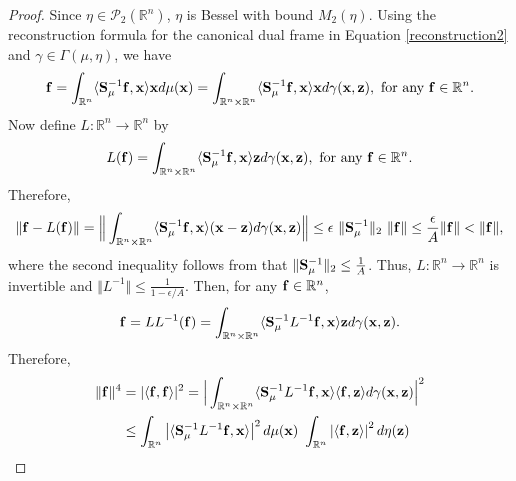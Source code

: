 \documentclass{amsart}
\numberwithin{equation}{section}
\theoremstyle{plain}
\theoremstyle{definition}
\begin{document}
\begin{proof}
Since $\eta \in \mathcal{P}_2(\mathbb{R}^n)$, $\eta$ is Bessel with bound  $M_2(\eta)$.  Using the reconstruction formula for the canonical dual frame in Equation \eqref{reconstruction2} and $\gamma \in \Gamma(\mu, \eta)$, we have
$$ 
{\bf f} =\int_{\mathbb{R}^n} \langle {\bf S}_\mu^{-1} {\bf f}, {\bf x} \rangle {\bf x}  d\mu({\bf x}) = \int_{\mathbb{R}^n \times \mathbb{R}^n} \langle {\bf S}_\mu^{-1} {\bf f}, {\bf x} \rangle {\bf x} d \gamma({\bf x},{\bf z})  , \ \text{for any} \ {\bf f} \in \mathbb{R}^n.
$$
Now define $L: \mathbb{R}^n \rightarrow \mathbb{R}^n$ by 
     \begin{equation*}
         L({\bf f}) = \int_{\mathbb{R}^n \times \mathbb{R}^n} \langle {\bf S}_\mu^{-1} {\bf f}, {\bf x} \rangle {\bf z}  d \gamma({\bf x},{\bf z}), \ \text{for any} \ {\bf f} \in \mathbb{R}^n.
     \end{equation*}
Therefore, 
\begin{equation*}
    \Vert {\bf f} -L({\bf f}) \Vert 
    = \Big \Vert \int_{\mathbb{R}^n \times \mathbb{R}^n} \langle {\bf S}_\mu^{-1}{\bf f}, {\bf x} \rangle ({\bf x}-{\bf z}) d \gamma({\bf x}, {\bf z}) \Big \Vert 
     \leq \epsilon \ \Vert {\bf S}_\mu^{-1} \Vert_2 \ \Vert  {\bf f} \Vert  \leq \frac{\epsilon}{A}  \Vert  {\bf f} \Vert < \Vert  {\bf f} \Vert,
\end{equation*}
where the second inequality follows from that $\|{\bf S}_\mu^{-1}\|_2 \leq \frac{1}{A}$. 
Thus, $L: \mathbb{R}^n \rightarrow \mathbb{R}^n$ is invertible and $\Vert L^{-1} \Vert \leq \frac{1}{1-\epsilon/ A}$.
Then, for any ${\bf f} \in \mathbb{R}^n$, 
\begin{equation*}
    {\bf f} = LL^{-1}({\bf f}) =  \int_{\mathbb{R}^n \times \mathbb{R}^n} \langle {\bf S}_\mu^{-1}L^{-1} {\bf f}, {\bf x} \rangle {\bf z} d\gamma({\bf x},{\bf z}).
\end{equation*}
Therefore, 
\begin{equation*}
\begin{split}
   \Vert {\bf f} \Vert^4 &=  |\langle {\bf f}, {\bf f} \rangle|^2 = \Big \vert \int_{\mathbb{R}^n \times \mathbb{R}^n} \langle {\bf S}_\mu^{-1}L^{-1} {\bf f}, {\bf x} \rangle \langle  {\bf f}, {\bf z} \rangle d \gamma({\bf x},{\bf z}) \Big \vert^2 \\
    & \leq \int_{\mathbb{R}^n} \left|\langle {\bf S}_\mu^{-1} L^{-1}{\bf f}, {\bf x} \rangle \right|^2 d\mu({\bf x})  \ \int_{\mathbb{R}^n} \left| \langle {\bf f}, {\bf z} \rangle \right|^2 d\eta({\bf z})\\

\end{split}
\end{equation*}
\end{proof}
\end{document}
